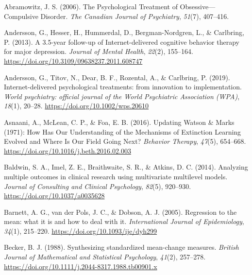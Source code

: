 \documentclass[
  man,floatsintext]{apa7}
\newlength{\cslhangindent}
\newlength{\cslentryspacingunit} %
\newenvironment{CSLReferences}[2] %
 {%
  \setlength{\parindent}{0pt}
  \ifodd #1
  \let\oldpar\par
  \def\par{\hangindent=\cslhangindent\oldpar}
  \fi
  \setlength{\parskip}{#2\cslentryspacingunit}
 }%
 {}
\begin{document}
\hypertarget{refs}{}
\begin{CSLReferences}{1}{0}
\leavevmode{}%
Abramowitz, J. S. (2006). The Psychological Treatment of Obsessive---Compulsive Disorder. \emph{The Canadian Journal of Psychiatry}, \emph{51}(7), 407--416.

\leavevmode{}%
Andersson, G., Hesser, H., Hummerdal, D., Bergman-Nordgren, L., \& Carlbring, P. (2013). A 3.5-year follow-up of Internet-delivered cognitive behavior therapy for major depression. \emph{Journal of Mental Health}, \emph{22}(2), 155--164. \url{https://doi.org/10.3109/09638237.2011.608747}

\leavevmode{}%
Andersson, G., Titov, N., Dear, B. F., Rozental, A., \& Carlbring, P. (2019). Internet-delivered psychological treatments: from innovation to implementation. \emph{World psychiatry: official journal of the World Psychiatric Association (WPA)}, \emph{18}(1), 20--28. \url{https://doi.org/10.1002/wps.20610}

\leavevmode{}%
Asnaani, A., McLean, C. P., \& Foa, E. B. (2016). Updating Watson \& Marks (1971): How Has Our Understanding of the Mechanisms of Extinction Learning Evolved and Where Is Our Field Going Next? \emph{Behavior Therapy}, \emph{47}(5), 654--668. \url{https://doi.org/10.1016/j.beth.2016.02.003}

\leavevmode{}%
Baldwin, S. A., Imel, Z. E., Braithwaite, S. R., \& Atkins, D. C. (2014). Analyzing multiple outcomes in clinical research using multivariate multilevel models. \emph{Journal of Consulting and Clinical Psychology}, \emph{82}(5), 920--930. \url{https://doi.org/10.1037/a0035628}

\leavevmode{}%
Barnett, A. G., van der Pols, J. C., \& Dobson, A. J. (2005). Regression to the mean: what it is and how to deal with it. \emph{International Journal of Epidemiology}, \emph{34}(1), 215--220. \url{https://doi.org/10.1093/ije/dyh299}

\leavevmode{}%
Becker, B. J. (1988). Synthesizing standardized mean-change measures. \emph{British Journal of Mathematical and Statistical Psychology}, \emph{41}(2), 257--278. \url{https://doi.org/10.1111/j.2044-8317.1988.tb00901.x}


\end{CSLReferences}
\end{document}
